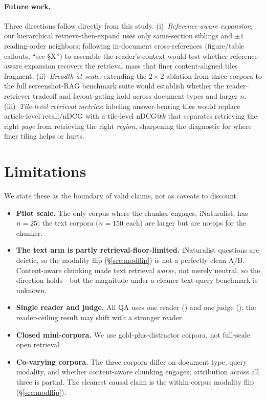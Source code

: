 \documentclass[11pt]{article}
\begin{document}
\paragraph{Future work.} Three directions follow directly from this study.
(i)~\emph{Reference-aware expansion}: our hierarchical retrieve-then-expand uses only
same-section siblings and $\pm1$ reading-order neighbors; following in-document
cross-references (figure/table callouts, ``see \S X'') to assemble the reader's context
would test whether reference-aware expansion recovers the retrieval mass that finer
content-aligned tiles fragment. (ii)~\emph{Breadth at scale}: extending the $2\times2$
ablation from three corpora to the full screenshot-RAG benchmark suite would establish
whether the reader--retriever tradeoff and layout-gating hold across document types and
larger $n$. (iii)~\emph{Tile-level retrieval metrics}: labeling answer-bearing tiles
would replace article-level recall/nDCG with a tile-level nDCG@$k$ that separates
retrieving the right \emph{page} from retrieving the right \emph{region}, sharpening the
diagnostic for where finer tiling helps or hurts.

\section{Limitations}\label{sec:limitations}
We state these as the boundary of valid claims, not as caveats to discount.
\begin{itemize}\setlength\itemsep{1pt}
  \item \textbf{Pilot scale.} The only corpus where the chunker engages, iNaturalist, has $n=25$;
        the text corpora ($n=150$ each) are larger but are no-ops for the chunker.
  \item \textbf{The text arm is partly retrieval-floor-limited.} iNaturalist questions are deictic, so
        the modality flip (\S\ref{sec:modflip}) is not a perfectly clean A/B. Content-aware chunking made
        text retrieval \emph{worse}, not merely neutral, so the direction holds---but the magnitude under
        a cleaner text-query benchmark is unknown.
  \item \textbf{Single reader and judge.} All QA uses one reader (\texttt{\ReaderModel}) and one judge
        (\texttt{\JudgeModel}); the reader-ceiling result may shift with a stronger reader.
  \item \textbf{Closed mini-corpora.} We use gold-plus-distractor corpora, not full-scale open retrieval.
  \item \textbf{Co-varying corpora.} The three corpora differ on document type, query modality, and
        whether content-aware chunking engages; attribution across all three is partial. The cleanest
        causal claim is the within-corpus modality flip (\S\ref{sec:modflip}).
\end{itemize}
\end{document}
